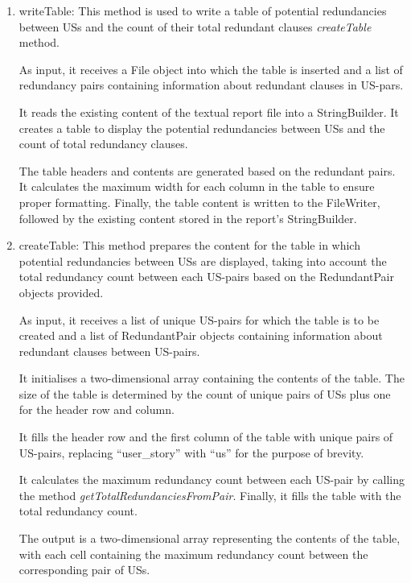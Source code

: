 \begin{enumerate}
	\item writeTable: This method is used to write a table of potential redundancies between USs and the count of their total redundant clauses \textit{createTable} method.%
	
	As input, it receives a File object into which the table is inserted and a list of redundancy pairs containing information about redundant clauses in US-pars.
	
	It reads the existing content of the textual report file into a StringBuilder. It creates a table to display the potential redundancies between USs and the count of total redundancy clauses.
	
	The table headers and contents are generated based on the redundant pairs. It calculates the maximum width for each column in the table to ensure proper formatting. Finally, the table content is written to the FileWriter, followed by the existing content stored in the report's StringBuilder.
	
	\item createTable: This method prepares the content for the table in which potential redundancies between USs are displayed, taking into account the total redundancy count between each US-pairs based on the RedundantPair objects provided.
	
	As input, it receives a list of unique US-pairs for which the table is to be created and a list of RedundantPair objects containing information about redundant clauses between US-pairs.
	
	It initialises a two-dimensional array containing the contents of the table. The size of the table is determined by the count of unique pairs of USs plus one for the header row and column.
	
	It fills the header row and the first column of the table with unique pairs of US-pairs, replacing \enquote{user\_story} with \enquote{us} for the purpose of brevity.
	
	It calculates the maximum redundancy count between each US-pair by calling the method \textit{getTotalRedundanciesFromPair}. Finally, it fills the table with the total redundancy count. 
	
	The output is a two-dimensional array representing the contents of the table, with each cell containing the maximum redundancy count between the corresponding pair of USs.
	

\end{enumerate}
